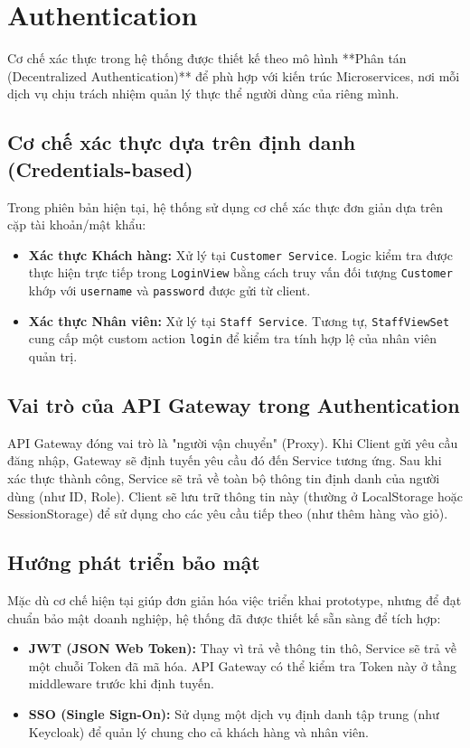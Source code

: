 \documentclass[12pt,a4paper]{report}
\begin{document}
\section{Authentication}
Cơ chế xác thực trong hệ thống được thiết kế theo mô hình **Phân tán (Decentralized Authentication)** để phù hợp với kiến trúc Microservices, nơi mỗi dịch vụ chịu trách nhiệm quản lý thực thể người dùng của riêng mình.

\subsection{Cơ chế xác thực dựa trên định danh (Credentials-based)}
Trong phiên bản hiện tại, hệ thống sử dụng cơ chế xác thực đơn giản dựa trên cặp tài khoản/mật khẩu:
\begin{itemize}
    \item \textbf{Xác thực Khách hàng:} Xử lý tại \texttt{Customer Service}. Logic kiểm tra được thực hiện trực tiếp trong \texttt{LoginView} bằng cách truy vấn đối tượng \texttt{Customer} khớp với \texttt{username} và \texttt{password} được gửi từ client.
    \item \textbf{Xác thực Nhân viên:} Xử lý tại \texttt{Staff Service}. Tương tự, \texttt{StaffViewSet} cung cấp một custom action \texttt{login} để kiểm tra tính hợp lệ của nhân viên quản trị.
\end{itemize}

\subsection{Vai trò của API Gateway trong Authentication}
API Gateway đóng vai trò là "người vận chuyển" (Proxy). Khi Client gửi yêu cầu đăng nhập, Gateway sẽ định tuyến yêu cầu đó đến Service tương ứng. Sau khi xác thực thành công, Service sẽ trả về toàn bộ thông tin định danh của người dùng (như ID, Role). Client sẽ lưu trữ thông tin này (thường ở LocalStorage hoặc SessionStorage) để sử dụng cho các yêu cầu tiếp theo (như thêm hàng vào giỏ).

\subsection{Hướng phát triển bảo mật}
Mặc dù cơ chế hiện tại giúp đơn giản hóa việc triển khai prototype, nhưng để đạt chuẩn bảo mật doanh nghiệp, hệ thống đã được thiết kế sẵn sàng để tích hợp:
\begin{itemize}
    \item \textbf{JWT (JSON Web Token):} Thay vì trả về thông tin thô, Service sẽ trả về một chuỗi Token đã mã hóa. API Gateway có thể kiểm tra Token này ở tầng middleware trước khi định tuyến.
    \item \textbf{SSO (Single Sign-On):} Sử dụng một dịch vụ định danh tập trung (như Keycloak) để quản lý chung cho cả khách hàng và nhân viên.
\end{itemize}
\end{document}
